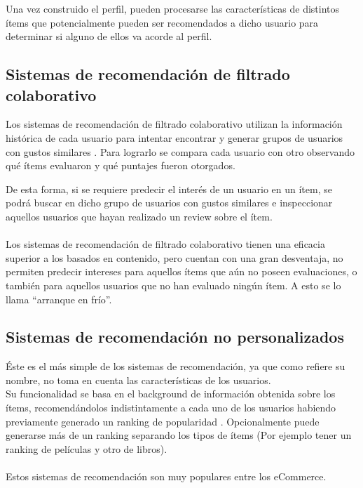 Una vez construido el perfil, pueden procesarse las características de distintos ítems que potencialmente pueden ser recomendados a dicho usuario para determinar si alguno de ellos va acorde al perfil.
\subsection{Sistemas de recomendación de filtrado colaborativo}
Los sistemas de recomendación de filtrado colaborativo utilizan la información histórica de cada usuario para intentar encontrar y generar grupos de usuarios con gustos similares \cite{Systems2011}. Para lograrlo se compara cada usuario con otro observando qué ítems evaluaron y qué puntajes fueron otorgados. 

De esta forma, si se requiere predecir el interés de un usuario en un ítem, se podrá buscar en dicho grupo de usuarios con gustos similares e inspeccionar aquellos usuarios que hayan realizado un review sobre el ítem.
\\\\
Los sistemas de recomendación de filtrado colaborativo tienen una eficacia superior a los basados en contenido, pero cuentan con una gran desventaja, no permiten predecir intereses para aquellos ítems que aún no poseen evaluaciones, o también para aquellos usuarios que no han evaluado ningún ítem.  A esto se lo llama “arranque en frío”.
\subsection{Sistemas de recomendación no personalizados}

Éste es el más simple de los sistemas de recomendación, ya que como refiere su nombre, no 
toma en cuenta las características de los usuarios.\\
Su funcionalidad se basa en el background de información obtenida sobre los ítems, recomendándolos
indistintamente a cada uno de los usuarios habiendo previamente generado un ranking de popularidad \cite{Poriya2014}.
Opcionalmente puede generarse más de un ranking separando los tipos de ítems (Por ejemplo tener un ranking de 
películas y otro de libros).\\
\\
Estos sistemas de recomendación son muy populares entre los eCommerce.

